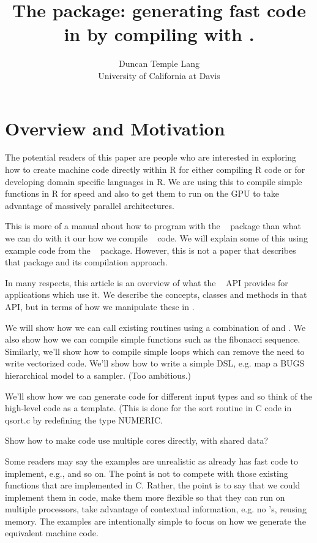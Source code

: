 \documentclass[article]{jss}
\author{Duncan Temple Lang\\University of California at Davis}
\title{The \Rpkg{Rllvm} package: generating fast code in \R{} by compiling with \llvm.}
\def\RClang{\Rpkg{RCIndex}}
\def\Rllvm{\Rpkg{Rllvm}}
\begin{document}
\section{Overview and Motivation}\label{sec:Introduction}

The potential readers of this paper are people who are interested in
exploring how to create machine code directly within R for either
compiling R code or for developing domain specific languages in R.
We are using this to compile simple functions in R for speed 
and also to get them to run on the GPU to take advantage 
of massively parallel architectures.

This is more of a manual about how to program with the
~\cite{bib:Rllvm} package than what we can do with it our
how we compile \R{}~\cite{bib:R} code.  We will explain some of this
using example code from the ~\cite{bib:RLLVMCompile} package. However, this
is not a paper that describes that package and its compilation
approach.

In many respects, this article is an overview of what the \llvm~\cite{bib:llvm}
API provides for applications which use it. We describe the concepts,
classes and methods in that API, but in terms of how we manipulate these
in \R.

We will show how we can call existing \C{} routines using a
combination of \RClang{} and \Rllvm.  We also show how we can compile
simple functions such as the fibonacci sequence.  Similarly, we'll
show how to compile simple loops which can remove the need to write
vectorized code.  We'll show how to write a simple DSL, e.g. map a
BUGS hierarchical model to a sampler. (Too ambitious.)


We'll show how we can generate code for different input types
and so think of the high-level code as a template.
(This is done for the sort routine in C code in qsort.c by redefining the
type NUMERIC.

Show how to make code use multiple cores directly, with shared data?

Some readers may say the examples are unrealistic as \R{} already has
fast code to implement, e.g.,  and so on.  The point is not
to compete with those existing functions that are implemented in
C. Rather, the point is to say that we could implement them in \R{}
code, make them more flexible so that they can run on multiple
processors, take advantage of contextual information, e.g. no \na's,
reusing memory. The examples are intentionally simple to focus on how
we generate the equivalent machine code.
\end{document}
